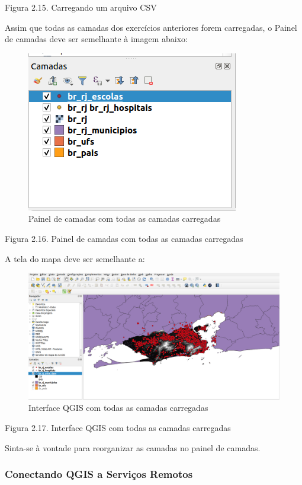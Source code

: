 \documentclass[
]{book}
\begin{document}
Figura 2.15. Carregando um arquivo CSV

Assim que todas as camadas dos exercícios anteriores forem carregadas, o Painel de camadas deve ser semelhante à imagem abaixo:

\begin{figure}
\centering
\includegraphics{media/modulo2/layers-panel-2.png}
\caption{Painel de camadas com todas as camadas carregadas}
\end{figure}

Figura 2.16. Painel de camadas com todas as camadas carregadas

A tela do mapa deve ser semelhante a:

\begin{figure}
\centering
\includegraphics{media/modulo2/map-canvas-1.png}
\caption{Interface QGIS com todas as camadas carregadas}
\end{figure}

Figura 2.17. Interface QGIS com todas as camadas carregadas

Sinta-se à vontade para reorganizar as camadas no painel de camadas.

\hypertarget{conectando-qgis-a-serviuxe7os-remotos}{%
\subsubsection{\texorpdfstring{\textbf{Conectando QGIS a Serviços Remotos}}{Conectando QGIS a Serviços Remotos}}\label{conectando-qgis-a-serviuxe7os-remotos}}
\end{document}
